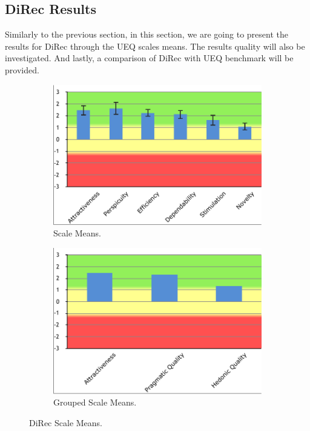 \subsection{DiRec Results}
Similarly to the previous section, in this section, we are going to present the
results for DiRec through the UEQ scales means. The results quality will also be
investigated. And lastly, a comparison of DiRec with UEQ benchmark will be
provided.
\begin{figure}[!htbp]
\centering
\begin{subfigure}[b]{0.45\textwidth}
\includegraphics[width=\textwidth]{figures/direc-results}
\caption{Scale Means.}
\label{fig:figure516a}
\end{subfigure}
\begin{subfigure}[b]{0.45\textwidth}
\includegraphics[width=\textwidth]{figures/direc-results2}
\caption{Grouped Scale Means.}
\label{fig:figure516b}
\end{subfigure}
\caption{DiRec Scale Means.}
\label{fig:figure516}
\end{figure}
